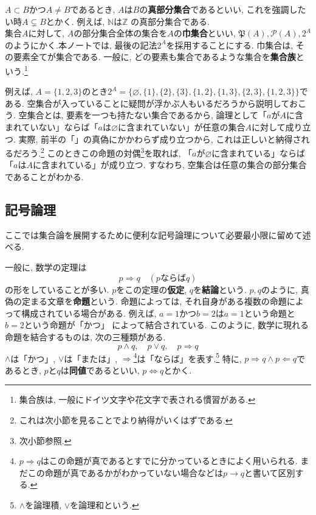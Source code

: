         $A\subset B$かつ$A\neq B$であるとき, $A$は$B$の\textbf{真部分集合}であるといい, これを強調したい時$A\subsetneq B$とかく. 例えば, $\mathbb{N}$は$\mathbb{Z}$
        の真部分集合である.\\

        集合$A$に対して, $A$の部分集合全体の集合を$A$の\textbf{巾集合}といい, $\mathfrak{P}(A), \mathcal{P}(A), 2^{A}$のようにかく.本ノートでは, 最後の記法$2^{A}$を採用することにする.
        巾集合は, その要素全てが集合である. 一般に, どの要素も集合であるような集合を\textbf{集合族}という.\footnote{集合族は, 一般にドイツ文字や花文字で表される慣習がある.}

        例えば, $A=\{1,2,3\}$のとき$2^{A}=\{\varnothing,\{1\},\{2\},\{3\},\{1,2\},\{1,3\},\{2,3\},\{1,2,3\}\}$である. 空集合が入っていることに疑問が浮かぶ人もいるだろうから説明しておこう.
        空集合とは, 要素を一つも持たない集合であるから, 論理として「$a$が$A$に含まれていない」ならば「$a$は$\varnothing$に含まれていない」が任意の集合$A$に対して成り立つ.
        実際, 前半の「」の真偽にかかわらず成り立つから, これは正しいと納得されるだろう.\footnote{これは次小節を見ることでより納得がいくはずである.} 
        このときこの命題の対偶\footnote{次小節参照.}を取れば, 「$a$が$\varnothing$に含まれている」ならば「$a$は$A$に含まれている」が成り立つ.
        すなわち, 空集合は任意の集合の部分集合であることがわかる. 
    \clearpage
    \subsection{記号論理}
        ここでは集合論を展開するために便利な記号論理について必要最小限に留めて述べる.

        一般に, 数学の定理は
        \begin{equation}
            p\Rightarrow q \quad (\text{$p$ならば$q$}) \label{eq:集合論基礎:数学の定理の構造}
        \end{equation}
        の形をしていることが多い. $p$をこの定理の\textbf{仮定}, $q$を\textbf{結論}という. $p,q$のように, 真偽の定まる文章を\textbf{命題}という.
        命題によっては, それ自身がある複数の命題によって構成されている場合がある. 例えば, $a=1$かつ$b=2$は$a=1$という命題と$b=2$という命題が「かつ」
        によって結合されている. このように, 数学に現れる命題を結合するものは, 次の三種類がある.
        \begin{equation*}
            p\land q,\quad p \lor q,\quad p \Rightarrow q 
        \end{equation*}
        $\land$は「かつ」, $\lor$は「または」, $\Rightarrow$\footnote{$p\Rightarrow q$はこの命題が真であるとすでに分かっているときによく用いられる. まだこの命題が真であるかがわかっていない場合などは$p\rightarrow q$と書いて区別する.}は「ならば」を表す.\footnote{$\land$を論理積, $\lor$を論理和という.} 特に, $p\Rightarrow q \land p \Leftarrow q$であるとき, 
        $p$と$q$は\textbf{同値}であるといい, $p \Leftrightarrow q$とかく.


